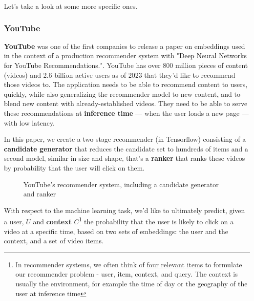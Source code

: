 \documentclass[11pt, table]{diazessay} %
\begin{document}
\begin{sloppypar}
Let's take a look at some more specific ones. 

\subsubsection{YouTube}

\textbf{YouTube }was one of the first companies to release a paper on embeddings used in the context of a production recommender system with "Deep Neural Networks for YouTube Recommendations."\citep{covington2016deep}. YouTube has over 800 million pieces of content (videos) and 2.6 billion active users as of 2023 that they'd like to recommend those videos to. The application needs to be able to recommend content to users, quickly, while also generalizing the recommender model to new content, and to blend new content with already-established videos. They need to be able to serve these recommendations at \textbf{inference time} --- when the user loads a new page --- with low latency. 

In this paper, we create a two-stage recommender (in Tensorflow) consisting of a \textbf{candidate generator} that reduces the candidate set to hundreds of items and a second model, similar in size and shape, that's a \textbf{ranker} that ranks these videos by probability that the user will click on them.

\begin{figure}[H]
\caption{YouTube's recommender system, including a candidate generator and ranker\citep{covington2016deep}}
\end{figure}

With respect to the machine learning task, we'd like to ultimately predict, given a user, $U$ and \textbf{context} $C$\footnote{In recommender systems, we often think of \href{https://md.ekstrandom.net/blog/2015/10/search-and-recsys}{four relevant items} to formulate our recommender problem - user, item, context, and query. The context is usually the environment, for example the time of day or the geography of the user at inference time } the probability that the user is likely to click on a video at a specific time, based on two sets of embeddings: the user and the context, and a set of video items. 


\end{sloppypar}
\end{document}

